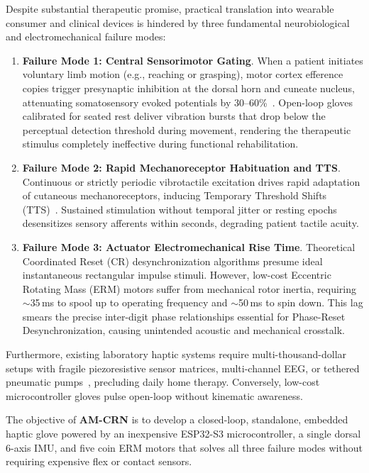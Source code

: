 \documentclass[10pt,twocolumn]{article}
\begin{document}
Despite substantial therapeutic promise, practical translation into wearable consumer and clinical devices is hindered by three fundamental neurobiological and electromechanical failure modes:
\begin{enumerate}
    \item \textbf{Failure Mode 1: Central Sensorimotor Gating}. When a patient initiates voluntary limb motion (e.g., reaching or grasping), motor cortex efference copies trigger presynaptic inhibition at the dorsal horn and cuneate nucleus, attenuating somatosensory evoked potentials by 30--60\%~\cite{human_factors_2024_motion_sensitivity}. Open-loop gloves calibrated for seated rest deliver vibration bursts that drop below the perceptual detection threshold during movement, rendering the therapeutic stimulus completely ineffective during functional rehabilitation.
    \item \textbf{Failure Mode 2: Rapid Mechanoreceptor Habituation and TTS}. Continuous or strictly periodic vibrotactile excitation drives rapid adaptation of cutaneous mechanoreceptors, inducing Temporary Threshold Shifts (TTS)~\cite{med_lav_2025_neurosensory_vibration}. Sustained stimulation without temporal jitter or resting epochs desensitizes sensory afferents within seconds, degrading patient tactile acuity.
    \item \textbf{Failure Mode 3: Actuator Electromechanical Rise Time}. Theoretical Coordinated Reset (CR) desynchronization algorithms presume ideal instantaneous rectangular impulse stimuli. However, low-cost Eccentric Rotating Mass (ERM) motors suffer from mechanical rotor inertia, requiring $\sim$35\,ms to spool up to operating frequency and $\sim$50\,ms to spin down. This lag smears the precise inter-digit phase relationships essential for Phase-Reset Desynchronization, causing unintended acoustic and mechanical crosstalk.
\end{enumerate}

Furthermore, existing laboratory haptic systems require multi-thousand-dollar setups with fragile piezoresistive sensor matrices, multi-channel EEG, or tethered pneumatic pumps~\cite{nature_comms_2024_embroidered_glove, jner_2025_bci_soft_robotic_glove}, precluding daily home therapy. Conversely, low-cost microcontroller gloves pulse open-loop without kinematic awareness. 

The objective of \textbf{AM-CRN} is to develop a closed-loop, standalone, embedded haptic glove powered by an inexpensive ESP32-S3 microcontroller, a single dorsal 6-axis IMU, and five coin ERM motors that solves all three failure modes without requiring expensive flex or contact sensors.
\end{document}
